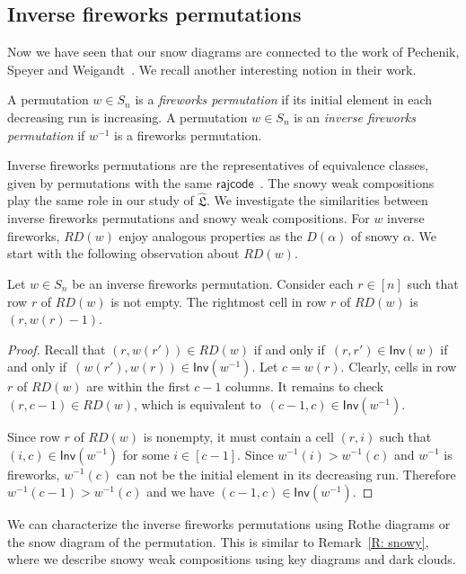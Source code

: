 \documentclass[ALCO]{cedram}
\newcommand{\fL}{\mathfrak{L}}
\newcommand{\topLas}{\widehat{\fL}}
\newcommand{\rajcode}{\mathsf{rajcode}}
\newcommand{\Inv}{\mathsf{Inv}}
\newcommand{\definition}[1]{{\color{darkred}\emph{#1}}}
\begin{document}
\subsection{Inverse fireworks permutations}\label{subsec.inverse.fireworks}
Now we have seen that our snow diagrams 
are connected to the work of Pechenik, Speyer and Weigandt~\cite{PSW}.
We recall another interesting notion in their work.

\begin{defn}
A permutation $w \in S_n$ is a 
\definition{fireworks permutation}
if its initial element in each decreasing run
is increasing. 
A permutation $w \in S_n$ is an 
\definition{inverse fireworks permutation}
if $w^{-1}$ is a fireworks permutation.
\end{defn}

Inverse fireworks permutations
are the representatives of equivalence classes,
given by permutations with the same $\rajcode$~\cite{PSW}.
The snowy weak compositions play the same role
in our study of $\topLas$.
We investigate the similarities between inverse fireworks permutations
and snowy weak compositions. 
For $w$ inverse fireworks, $RD(w)$ enjoy analogous properties as the $D(\alpha)$ of snowy $\alpha$. 
We start with the following 
observation about $RD(w)$.

\begin{lemma}\label{L: inv fire perm diagram}
Let $w \in S_n$ be an inverse fireworks permutation.
Consider each $r \in [n]$ such that 
row $r$ of $RD(w)$ is not empty. 
The rightmost cell in row $r$ of $RD(w)$
is $(r, w(r) - 1)$.
\end{lemma}
\begin{proof}
Recall that $(r, w(r')) \in RD(w)$ 
if and only if~$(r, r') \in \Inv(w)$
if and only if~$(w(r'), w(r)) 
\in \Inv(w^{-1})$.
Let $c = w(r)$.
Clearly, cells in row $r$
of $RD(w)$ are within the first $c - 1$
columns.
It remains to check $(r, c-1) \in RD(w)$,
which is equivalent to~$(c -1, c) \in \Inv(w^{-1})$.

Since row $r$ of $RD(w)$ is nonempty, 
it must contain a cell $(r,i)$ such that $(i,c)\in \Inv(w^{-1})$ 
for some $i \in [c-1]$. Since $w^{-1}(i)>w^{-1}(c)$ and $w^{-1}$ is 
fireworks, $w^{-1}(c)$ can not be the initial element in its 
decreasing run. Therefore $w^{-1}(c-1) > w^{-1}(c)$ and 
we have $(c-1, c) \in \Inv(w^{-1})$.
\end{proof}


We can characterize the inverse fireworks permutations
using Rothe diagrams or the snow diagram of the permutation. This 
is similar to Remark~\ref{R: snowy},
where we describe snowy weak compositions using key diagrams and 
dark clouds.
\end{document}
